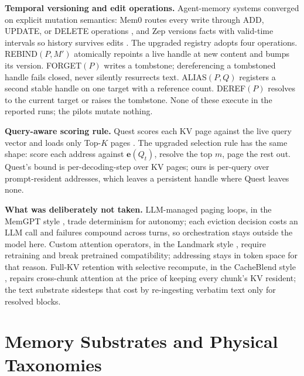 \documentclass[conference]{IEEEtran}
\begin{document}
\noindent\textbf{Temporal versioning and edit operations.} Agent-memory systems converged on explicit mutation semantics: Mem0 routes every write through ADD, UPDATE, or DELETE operations \cite{chhikara2025mem0}, and Zep versions facts with valid-time intervals so history survives edits \cite{rasmussen2025zep}. The upgraded registry adopts four operations. REBIND$(P, M')$ atomically repoints a live handle at new content and bumps its version. FORGET$(P)$ writes a tombstone; dereferencing a tombstoned handle fails closed, never silently resurrects text. ALIAS$(P, Q)$ registers a second stable handle on one target with a reference count. DEREF$(P)$ resolves to the current target or raises the tombstone. None of these execute in the reported runs; the pilots mutate nothing.

\noindent\textbf{Query-aware scoring rule.} Quest scores each KV page against the live query vector and loads only Top-$K$ pages \cite{tang2024quest}. The upgraded selection rule has the same shape: score each address against $\mathbf{e}(Q_t)$, resolve the top $m$, page the rest out. Quest's bound is per-decoding-step over KV pages; ours is per-query over prompt-resident addresses, which leaves a persistent handle where Quest leaves none.

\noindent\textbf{What was deliberately not taken.} LLM-managed paging loops, in the MemGPT style \cite{packer2023memgpt}, trade determinism for autonomy; each eviction decision costs an LLM call and failures compound across turns, so orchestration stays outside the model here. Custom attention operators, in the Landmark style \cite{mohtashami2023landmark}, require retraining and break pretrained compatibility; addressing stays in token space for that reason. Full-KV retention with selective recompute, in the CacheBlend style \cite{yao2025cacheblend}, repairs cross-chunk attention at the price of keeping every chunk's KV resident; the text substrate sidesteps that cost by re-ingesting verbatim text only for resolved blocks.

\section{Memory Substrates and Physical Taxonomies}\label{sec:substrates}
\end{document}
